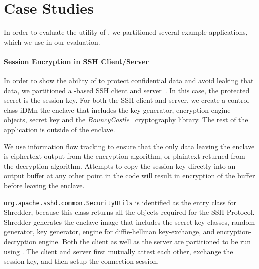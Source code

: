 \section{Case Studies}
\label{sec:case-study}

In order to evaluate the utility of \sysname{}, we partitioned
several example \java{} applications, which we use in our evaluation.


\paragraph{Session Encryption in SSH Client/Server}
In order to show the ability of \sysname{} to protect 
confidential data and avoid leaking that data,
we partitioned a \java{}-based SSH client and server~\cite{apache-sshd}.
In this case, the protected secret is the session key.
For both the SSH client and server, we create
a control class iDMn the enclave that includes 
the key generator, encryption engine objects, secret key
and the {\em BouncyCastle}~\cite{bouncycastle} cryptography library.
The rest of the application is outside of the enclave.

We use information flow tracking to ensure that the only data
leaving the enclave is ciphertext output from the encryption algorithm,
or plaintext returned from the decryption algorithm.
Attempts to copy the session key directly into an output buffer at any other point in the code
will result in encryption of the buffer before leaving the enclave.

{\tt org.apache.sshd.common.SecurityUtils} is identified as the entry class for Shredder, because this class returns all the objects required for the SSH Protocol.
Shredder generates the enclave image that includes the secret key classes, random generator, key generator, engine for diffie-hellman key-exchange, and encryption-decryption engine. Both the client as well as the server are partitioned to be run using \sysname{}. The client and server first mutually attest each other, exchange the session key, and then setup the connection session.

